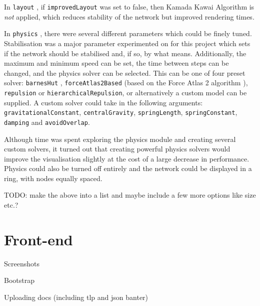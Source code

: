 \documentclass[../dissertation.tex]{subfiles}
\begin{document}
In \texttt{layout} \cite{visjslayout}, if \texttt{improvedLayout} was set to false, then Kamada Kawai Algorithm \cite{kamada1989algorithm} is \emph{not} applied, which reduces stability of the network but improved rendering times. 

In \texttt{physics} \cite{visjsphysics}, there were several different parameters which could be finely tuned. Stabilisation was a major parameter experimented on for this project which sets if the network should be stabilised and, if so, by what means. Additionally, the maximum and minimum speed can be set, the time between steps can be changed, and the physics solver can be selected. This can be one of four preset solver: \texttt{barnesHut} \cite{barnes1986hierarchical}, \texttt{forceAtlas2Based} (based on the Force Atlas 2 algorithm \cite{jacomy2014forceatlas2}), \texttt{repulsion} or \texttt{hierarchicalRepulsion}, or alternatively a custom model can be supplied. A custom solver could take in the following arguments: \texttt{gravitationalConstant}, \texttt{centralGravity}, \texttt{springLength}, \texttt{springConstant}, \texttt{damping} and \texttt{avoidOverlap}. 

Although time was spent exploring the physics module and creating several custom solvers, it turned out that creating powerful physics solvers would improve the visualisation slightly at the cost of a large decrease in performance. Physics could also be turned off entirely and the network could be displayed in a ring, with nodes equally spaced. 

TODO: make the above into a list and maybe include a few more options like size etc.?

\section{Front-end}

Screenshots

Bootstrap

Uploading docs (including tlp and json banter)
\end{document}
